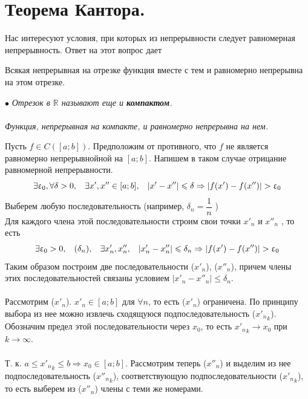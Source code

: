 	\section{Теорема Кантора.}
	Нас интересуют условия, при которых из непрерывности следует равномерная непрерывность. Ответ на этот вопрос дает
	\begin{theoremk}
		Всякая непрерывная на отрезке функция вместе с тем и равномерно непрерывна на этом отрезке.
	\end{theoremk}
	$\bullet$ \textit{Отрезок в $\mathbb{R}$ называют еще и \textbf{компактом}.} \\\\
	\textit{Функция, непрерывная на компакте, и равномерно непрерывна на нем.}
	\begin{Proof}
		Пусть $f \in C([a; b])$. Предположим от противного, что $f$ не является равномерно непрерывнойной на $[a; b]$. Напишем в таком случае отрицание равномерной непрерывности.
		$$\exists \varepsilon_0, \forall \delta > 0, \hspace{0,3 cm} \exists x', x'' \in [a; b], \hspace{0,3 cm} \vert x' - x'' \vert \leqslant \delta \Rightarrow \vert f(x') - f(x'') \vert > \varepsilon_0$$
		Выберем любую последовательность (например, $\delta _n = \dfrac{1}{n}$ ) \\
		Для каждого члена этой последовательности строим свои точки $x'_n$ и $x''_n$ , то есть
		$$\exists \varepsilon_0 > 0, \hspace{0,3 cm} (\delta_n), \hspace{0,3 cm} \exists x'_n, x''_n, \hspace{0,3 cm} \vert x'_n - x''_n \vert \leqslant \delta_n \Rightarrow \vert f(x') - f(x'') \vert > \varepsilon_0$$
		Таким образом построим две последовательности ($x'_n$), ($x''_n$),
		причем члены этих последовательностей связаны условием $\vert x'_n - x''_n \vert \leqslant \delta_n$.\\\\
		Рассмотрим ($x'_n$). $x'_n \in [a; b]$ для $\forall n$, то есть ($x'_n$) ограничена. По принципу выбора из нее можно извлечь сходящуюся подпоследовательность (${x'_n}_k$). Обозначим предел этой последовательности через $x_0$, то есть ${x'_n}_k \rightarrow x_0$ при $k \rightarrow \infty$.\\\\
		Т. к. $a \leqslant {x'_n}_k \leqslant b \Rightarrow x_0 \in [a; b]$.
		Рассмотрим теперь ($x''_n$) и выделим из нее подпоследовательность (${x''_n}_k$), соответствующую подпоследовательности (${x'_n}_k$), то есть выберем из ($x''_n$) члены с теми же номерами.\\\\

\end{Proof}
